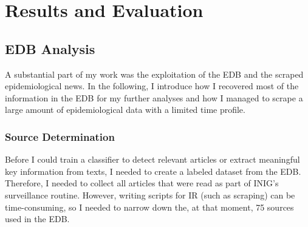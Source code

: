 \chapter{Results and Evaluation}

\section{EDB Analysis}\label{edb analysis}
  A substantial part of my work was the exploitation of the EDB and the scraped epidemiological news.
  In the following, I introduce how I recovered most of the information in the EDB for my further analyses and how I managed to scrape a large amount of epidemiological data with a limited time profile.

\subsection{Source Determination}\label{source determination}
  Before I could train a classifier to detect relevant articles or extract meaningful key information from texts, I needed to create a labeled dataset from the EDB.
  Therefore, I needed to collect all articles that were read as part of INIG's surveillance routine.
  However, writing scripts for IR (such as scraping) can be time-consuming, so I needed to narrow down the, at that moment, 75 sources used in the EDB.

